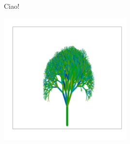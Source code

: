 \documentclass{article}\usepackage[]{graphicx}\usepackage[]{color}
\newenvironment{knitrout}{}{} %
\begin{document}
\begin{center}
Ciao!
\end{center}
\begin{knitrout}
\color{fgcolor}

{\centering \includegraphics[width=0.5\textwidth]{figure/rectree-1} 

}



\end{knitrout}
\end{document}
